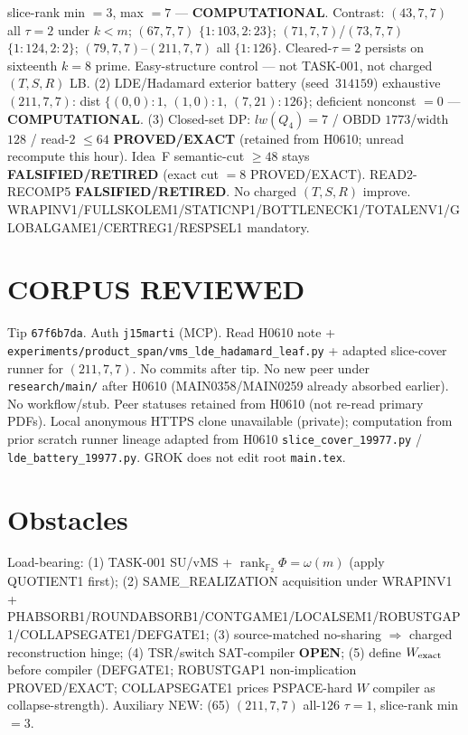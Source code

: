 \documentclass[11pt]{article}
\begin{document}
slice-rank min $=3$, max $=7$ --- \textbf{COMPUTATIONAL}.
Contrast: $(43,7,7)$ all $\tau{=}2$ under $k{<}m$; $(67,7,7)$ $\{1{:}103,2{:}23\}$;
$(71,7,7)$/$(73,7,7)$ $\{1{:}124,2{:}2\}$; $(79,7,7)$--$(211,7,7)$ all $\{1{:}126\}$.
Cleared-$\tau{=}2$ persists on sixteenth $k{=}8$ prime. Easy-structure control --- not TASK-001,
not charged $(T,S,R)$ LB.
(2) LDE/Hadamard exterior battery (seed~$314159$) exhaustive $(211,7,7)$:
dist $\{(0,0){:}1,\,(1,0){:}1,\,(7,21){:}126\}$; deficient nonconst $=0$ --- \textbf{COMPUTATIONAL}.
(3) Closed-set DP: $lw(Q_4)=7$ / OBDD $1773$/width $128$ / read-$2$ $\le64$
\textbf{PROVED/EXACT} (retained from H0610; unread recompute this hour).
Idea~F semantic-cut $\ge48$ stays \textbf{FALSIFIED/RETIRED} (exact cut $=8$ PROVED/EXACT).
READ2-RECOMP5 \textbf{FALSIFIED/RETIRED}. No charged $(T,S,R)$ improve.
WRAPINV1/FULLSKOLEM1/STATICNP1/BOTTLENECK1/TOTALENV1/GLOBALGAME1/CERTREG1/RESPSEL1 mandatory.

\section*{CORPUS REVIEWED}
Tip \texttt{67f6b7da}. Auth \texttt{j15marti} (MCP). Read H0610 note +
\texttt{experiments/product\_span/vms\_lde\_hadamard\_leaf.py} + adapted slice-cover runner for $(211,7,7)$.
No commits after tip. No new peer under \texttt{research/main/} after H0610
(MAIN0358/MAIN0259 already absorbed earlier).
No workflow/stub. Peer statuses retained from H0610 (not re-read primary PDFs).
Local anonymous HTTPS clone unavailable (private);
computation from prior scratch runner lineage adapted from H0610
\texttt{slice\_cover\_19977.py} / \texttt{lde\_battery\_19977.py}.
GROK does not edit root \texttt{main.tex}.

\section*{Obstacles}
Load-bearing: (1) TASK-001 SU/vMS + $\operatorname{rank}_{\mathbb F_2}\Phi=\omega(m)$ (apply QUOTIENT1 first);
(2) SAME\_REALIZATION acquisition under WRAPINV1 + PHABSORB1/ROUNDABSORB1/CONTGAME1/LOCALSEM1/ROBUSTGAP1/COLLAPSEGATE1/DEFGATE1;
(3) source-matched no-sharing $\Rightarrow$ charged reconstruction hinge;
(4) TSR/switch SAT-compiler \textbf{OPEN};
(5) define $W_{\rm exact}$ before compiler (DEFGATE1; ROBUSTGAP1 non-implication PROVED/EXACT;
COLLAPSEGATE1 prices PSPACE-hard $W$ compiler as collapse-strength).
Auxiliary NEW: (65) $(211,7,7)$ all-$126$ $\tau{=}1$, slice-rank min $=3$.
\end{document}
